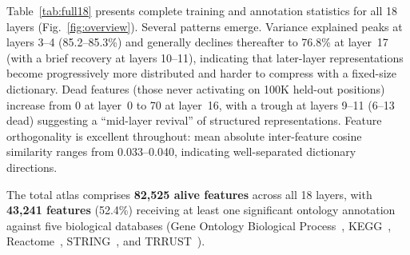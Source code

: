 \documentclass[onecolumn]{article}
\begin{document}
Table~\ref{tab:full18} presents complete training and annotation statistics for all 18 layers (Fig.~\ref{fig:overview}). Several patterns emerge. Variance explained peaks at layers 3--4 (85.2--85.3\%) and generally declines thereafter to 76.8\% at layer~17 (with a brief recovery at layers 10--11), indicating that later-layer representations become progressively more distributed and harder to compress with a fixed-size dictionary. Dead features (those never activating on 100K held-out positions) increase from 0 at layer~0 to 70 at layer~16, with a trough at layers 9--11 (6--13 dead) suggesting a ``mid-layer revival'' of structured representations. Feature orthogonality is excellent throughout: mean absolute inter-feature cosine similarity ranges from 0.033--0.040, indicating well-separated dictionary directions.

The total atlas comprises \textbf{82,525 alive features} across all 18 layers, with \textbf{43,241 features} (52.4\%) receiving at least one significant ontology annotation against five biological databases (Gene Ontology Biological Process~\cite{ashburner2000go}, KEGG~\cite{kanehisa2000kegg}, Reactome~\cite{jassal2020reactome}, STRING~\cite{szklarczyk2023string}, and TRRUST~\cite{han2018trrust}).
\end{document}
